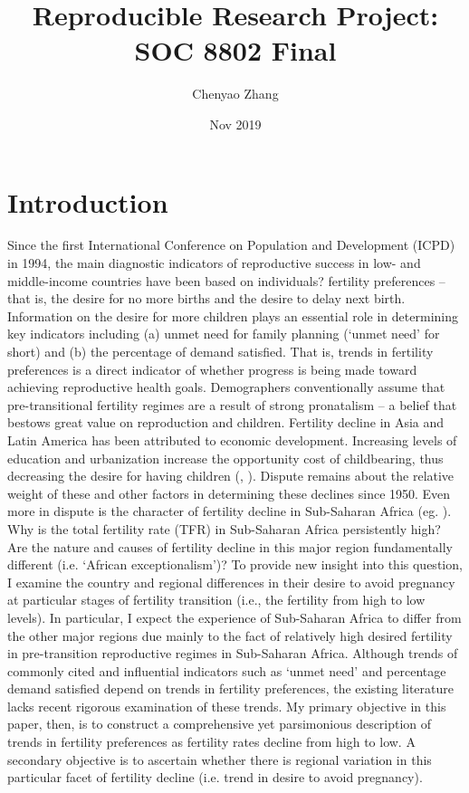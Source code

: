 \documentclass[12pt]{article}
\title{\vfill Reproducible Research Project: SOC 8802 Final}
\author{Chenyao Zhang}
\affil[1]{Department of Sociology, The Ohio State University}
\date{Nov 2019\vfill}
\begin{document}
\maketitle




\clearpage 
{} 
\newpage


\section{Introduction}

Since the first International Conference on Population and Development (ICPD) in 1994, the main diagnostic indicators of reproductive success in low- and middle-income countries have been based on individuals? fertility preferences -- that is, the desire for no more births and the desire to delay next birth. Information on the desire for more children plays an essential role in determining key indicators including (a) unmet need for family planning (`unmet need' for short) and (b) the percentage of demand satisfied. That is, trends in fertility preferences is a direct indicator of whether progress is being made toward achieving reproductive health goals.
Demographers conventionally assume that pre-transitional fertility regimes are a result of strong pronatalism -- a belief that bestows great value on reproduction and children. Fertility decline in Asia and Latin America has been attributed to economic development. Increasing levels of education and urbanization increase the opportunity cost of childbearing, thus decreasing the desire for having children (\cite{easterlin}, \cite{bc}). Dispute remains about the relative weight of these and other factors in determining these declines since 1950. Even more in dispute is the character of fertility decline in Sub-Saharan Africa (eg.  \cite{bc}). Why is the total fertility rate (TFR) in Sub-Saharan Africa persistently high? Are the nature and causes of fertility decline in this major region fundamentally different (i.e. `African exceptionalism')?  To provide new insight into this question, I examine the country and regional differences in their desire to avoid pregnancy at particular stages of fertility transition (i.e., the fertility from high to low levels). In particular, I expect the experience of Sub-Saharan Africa to differ from the other major regions due mainly to the fact of relatively high desired fertility in pre-transition reproductive regimes in Sub-Saharan Africa. 
Although trends of commonly cited and influential indicators such as `unmet need' and percentage demand satisfied depend on trends in fertility preferences, the existing literature lacks recent rigorous examination of these trends. My primary objective in this paper, then, is to construct a comprehensive yet parsimonious description of trends in fertility preferences as fertility rates decline from high to low. A secondary objective is to ascertain whether there is regional variation in this particular facet of fertility decline (i.e. trend in desire to avoid pregnancy).
\end{document}
